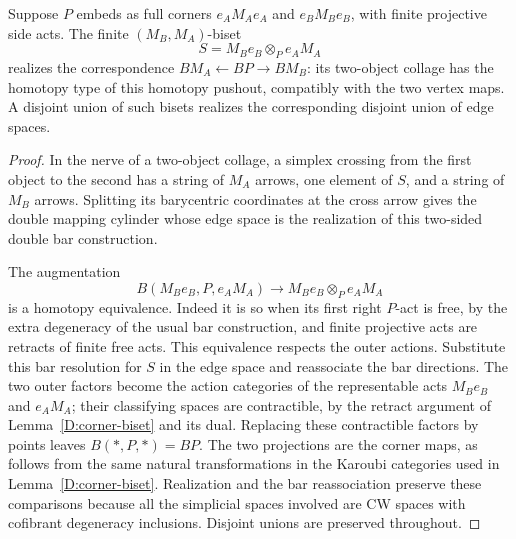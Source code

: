 \begin{lemma}
\label{D:projective-correspondence}
Suppose $P$ embeds as full corners $e_A M_A e_A$ and $e_B M_B e_B$, with
finite projective side acts. The finite $(M_B,M_A)$-biset
\[
 S=M_Be_B\otimes_P e_A M_A
\]
realizes the correspondence $BM_A\leftarrow BP\to BM_B$: its two-object
collage has the homotopy type of this homotopy pushout, compatibly with
the two vertex maps. A disjoint union of such bisets realizes the
corresponding disjoint union of edge spaces.
\end{lemma}
\begin{proof}
In the nerve of a two-object collage, a simplex crossing from the first
object to the second has a string of $M_A$ arrows, one element of $S$,
and a string of $M_B$ arrows. Splitting its barycentric coordinates at
the cross arrow gives the double mapping cylinder whose edge space is
the realization of this two-sided double bar construction.

The augmentation
\[
 B(M_Be_B,P,e_A M_A)\longrightarrow
 M_Be_B\otimes_P e_A M_A
\]
is a homotopy equivalence. Indeed it is so when its first right $P$-act
is free, by the extra degeneracy of the usual bar construction, and
finite projective acts are retracts of finite free acts. This equivalence
respects the outer actions. Substitute this bar resolution for $S$ in
the edge space and reassociate the bar directions. The two outer factors
become the action categories of the representable acts $M_Be_B$ and
$e_A M_A$; their classifying spaces are contractible, by the retract
argument of Lemma~\ref{D:corner-biset} and its dual. Replacing these
contractible factors by points leaves $B(*,P,*)=BP$. The two projections
are the corner maps, as follows from the same natural transformations
in the Karoubi categories used in Lemma~\ref{D:corner-biset}.
Realization and the bar reassociation preserve these comparisons because
all the simplicial spaces involved are CW spaces with cofibrant
degeneracy inclusions. Disjoint unions are preserved throughout.
\end{proof}

